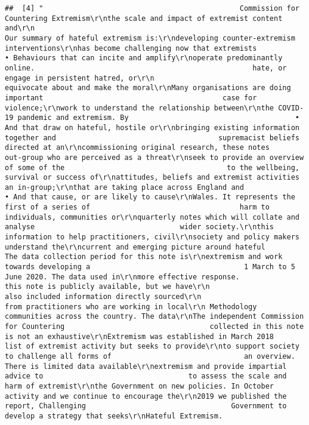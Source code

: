 \documentclass[
]{book}
\begin{document}
\begin{verbatim}
##  [4] "                                              Commission for Countering Extremism\r\nthe scale and impact of extremist content and\r\n                                                                              Our summary of hateful extremism is:\r\ndeveloping counter-extremism interventions\r\nhas become challenging now that extremists                                    • Behaviours that can incite and amplify\r\noperate predominantly online.                                                   hate, or engage in persistent hatred, or\r\n                                                                                equivocate about and make the moral\r\nMany organisations are doing important                                          case for violence;\r\nwork to understand the relationship between\r\nthe COVID-19 pandemic and extremism. By                                       • And that draw on hateful, hostile or\r\nbringing existing information together and                                      supremacist beliefs directed at an\r\ncommissioning original research, these notes                                    out-group who are perceived as a threat\r\nseek to provide an overview of some of the                                      to the wellbeing, survival or success of\r\nattitudes, beliefs and extremist activities                                     an in-group;\r\nthat are taking place across England and                                      • And that cause, or are likely to cause\r\nWales. It represents the first of a series of                                   harm to individuals, communities or\r\nquarterly notes which will collate and analyse                                  wider society.\r\nthis information to help practitioners, civil\r\nsociety and policy makers understand the\r\ncurrent and emerging picture around hateful                                The data collection period for this note is\r\nextremism and work towards developing a                                    1 March to 5 June 2020. The data used in\r\nmore effective response.                                                   this note is publicly available, but we have\r\n                                                                           also included information directly sourced\r\n                                                                           from practitioners who are working in local\r\n Methodology                                                               communities across the country. The data\r\nThe independent Commission for Countering                                  collected in this note is not an exhaustive\r\nExtremism was established in March 2018                                    list of extremist activity but seeks to provide\r\nto support society to challenge all forms of                               an overview. There is limited data available\r\nextremism and provide impartial advice to                                  to assess the scale and harm of extremist\r\nthe Government on new policies. In October                                 activity and we continue to encourage the\r\n2019 we published the report, Challenging                                  Government to develop a strategy that seeks\r\nHateful Extremism.        
\end{verbatim}
\end{document}

